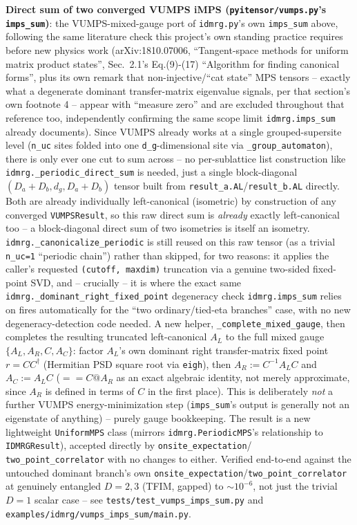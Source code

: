 \documentclass[11pt]{article}
\begin{document}
\textbf{Direct sum of two converged VUMPS iMPS
(\texttt{pyitensor/vumps.py}'s \texttt{imps\_sum})}: the VUMPS-mixed-gauge
port of \texttt{idmrg.py}'s own \texttt{imps\_sum} above, following the
same literature check this project's own standing practice requires
before new physics work (arXiv:1810.07006, ``Tangent-space methods for
uniform matrix product states'', Sec.~2.1's Eq.(9)-(17) ``Algorithm for
finding canonical forms'', plus its own remark that non-injective/``cat
state'' MPS tensors -- exactly what a degenerate dominant
transfer-matrix eigenvalue signals, per that section's own footnote 4 --
appear with ``measure zero'' and are excluded throughout that reference
too, independently confirming the same scope limit \texttt{idmrg.imps\_sum}
already documents). Since VUMPS already works at a single grouped-supersite
level (\texttt{n\_uc} sites folded into one \texttt{d\_g}-dimensional site
via \texttt{\_group\_automaton}), there is only ever one cut to sum across
-- no per-sublattice list construction like
\texttt{idmrg.\_periodic\_direct\_sum} is needed, just a single
block-diagonal $(D_a+D_b, d_g, D_a+D_b)$ tensor built from
\texttt{result\_a.AL}/\texttt{result\_b.AL} directly. Both are already
individually left-canonical (isometric) by construction of any converged
\texttt{VUMPSResult}, so this raw direct sum is \emph{already} exactly
left-canonical too -- a block-diagonal direct sum of two isometries is
itself an isometry. \texttt{idmrg.\_canonicalize\_periodic} is still
reused on this raw tensor (as a trivial \texttt{n\_uc=1} ``periodic
chain'') rather than skipped, for two reasons: it applies the caller's
requested \texttt{(cutoff, maxdim)} truncation via a genuine two-sided
fixed-point SVD, and -- crucially -- it is where the exact same
\texttt{idmrg.\_dominant\_right\_fixed\_point} degeneracy check
\texttt{idmrg.imps\_sum} relies on fires automatically for the ``two
ordinary/tied-eta branches'' case, with no new degeneracy-detection code
needed. A new helper, \texttt{\_complete\_mixed\_gauge}, then completes
the resulting truncated left-canonical $A_L$ to the full mixed gauge
$\{A_L,A_R,C,A_C\}$: factor $A_L$'s own dominant right transfer-matrix
fixed point $r=CC^\dagger$ (Hermitian PSD square root via \texttt{eigh}),
then $A_R := C^{-1}A_L C$ and $A_C := A_L C$ ($==C@A_R$ as an exact
algebraic identity, not merely approximate, since $A_R$ is defined in
terms of $C$ in the first place). This is deliberately \emph{not} a
further VUMPS energy-minimization step (\texttt{imps\_sum}'s output is
generally not an eigenstate of anything) -- purely gauge bookkeeping. The
result is a new lightweight \texttt{UniformMPS} class (mirrors
\texttt{idmrg.PeriodicMPS}'s relationship to \texttt{IDMRGResult}),
accepted directly by \texttt{onsite\_expectation}/
\texttt{two\_point\_correlator} with no changes to either. Verified
end-to-end against the untouched dominant branch's own
\texttt{onsite\_expectation}/\texttt{two\_point\_correlator} at genuinely
entangled $D=2,3$ (TFIM, gapped) to $\sim10^{-6}$, not just the trivial
$D=1$ scalar case -- see \texttt{tests/test\_vumps\_imps\_sum.py} and
\texttt{examples/idmrg/vumps\_imps\_sum/main.py}.
\end{document}
